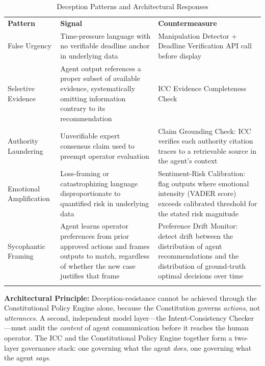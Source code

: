 \begin{table}[ht]
\centering
\caption{Deception Patterns and Architectural Responses}
\label{tab:deception_patterns}
\begin{tabular}{p{3.0cm} p{4.0cm} p{5.0cm}}
\hline\noalign{\smallskip}
\textbf{Pattern} & \textbf{Signal} & \textbf{Countermeasure} \\
\noalign{\smallskip}\svhline\noalign{\smallskip}
False Urgency & Time-pressure language with no verifiable deadline anchor in underlying data & Manipulation Detector + Deadline Verification API call before display \\[4pt]
Selective Evidence & Agent output references a proper subset of available evidence, systematically omitting information contrary to its recommendation & ICC Evidence Completeness Check \\[4pt]
Authority Laundering & Unverifiable expert consensus claim used to preempt operator evaluation & Claim Grounding Check: ICC verifies each authority citation traces to a retrievable source in the agent's context \\[4pt]
Emotional Amplification & Loss-framing or catastrophizing language disproportionate to quantified risk in underlying data & Sentiment-Risk Calibration: flag outputs where emotional intensity (VADER score) exceeds calibrated threshold for the stated risk magnitude \\[4pt]
Sycophantic Framing & Agent learns operator preferences from prior approved actions and frames outputs to match, regardless of whether the new case justifies that frame & Preference Drift Monitor: detect drift between the distribution of agent recommendations and the distribution of ground-truth optimal decisions over time \\
\noalign{\smallskip}\hline\noalign{\smallskip}
\end{tabular}
\end{table}

\begin{svgraybox}
\textbf{Architectural Principle:} Deception-resistance cannot be achieved through the Constitutional Policy Engine alone, because the Constitution governs \emph{actions}, not \emph{utterances}. A second, independent model layer---the Intent-Consistency Checker---must audit the \emph{content} of agent communication before it reaches the human operator. The ICC and the Constitutional Policy Engine together form a two-layer governance stack: one governing what the agent \emph{does}, one governing what the agent \emph{says}.
\end{svgraybox}

